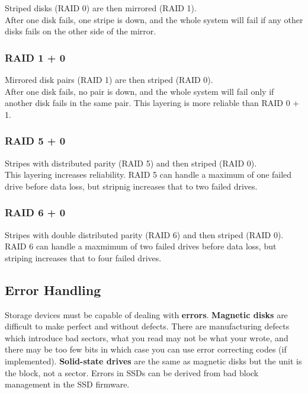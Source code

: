\documentclass{article}
\newcommand{\bold}[1]{\textbf{#1}}
\begin{document}
Striped disks (RAID 0) are then mirrored (RAID 1). \\ 

After one disk fails, one stripe is down, and the whole system will fail if any other disks fails on the other side of the mirror. 

\subsubsection{RAID 1 + 0}

Mirrored disk pairs (RAID 1) are then striped (RAID 0). \\ 

After one disk fails, no pair is down, and the whole system will fail only if another disk fails in the same pair. This layering is more reliable than RAID 0 + 1. 

\subsubsection{RAID 5 + 0}

Stripes with distributed parity (RAID 5) and then striped (RAID 0). \\ 

This layering increases reliability. RAID 5 can handle a maximum of one failed drive before data loss, but stripnig increases that to two failed drives. 

\subsubsection{RAID 6 + 0}

Stripes with double distributed parity (RAID 6) and then striped (RAID 0). \\ 

RAID 6 can handle a maxmimum of two failed drives before data loss, but striping increases that to four failed drives. 

\subsection{Error Handling}

Storage devices must be capable of dealing with \bold{errors}. \bold{Magnetic disks} are difficult to make perfect and without defects. There are manufacturing defects which introduce bad sectors, what you read may not be what your wrote, and there may be too few bits in which case you can use error correcting codes (if implemented). \bold{Solid-state drives} are the same as magnetic disks but the unit is the block, not a sector. Errors in SSDs can be derived from bad block management in the SSD firmware. \\ 
\end{document}
